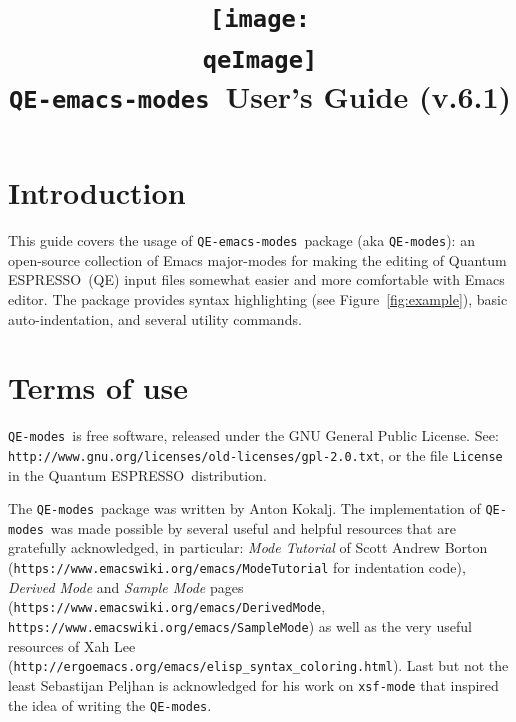 \documentclass[12pt,a4paper]{article}
\def\version{6.1}
\def\qe{{\sc Quantum ESPRESSO}}
\def\QEmodes{\texttt{QE-modes}}
\def\QEemodes{\texttt{QE-emacs-modes}}
\begin{document}
 
\author{}
\date{}

\def\qeImage{../../../Doc/quantum_espresso.pdf}

\title{
  \texttt{[image: \\qeImage]} \\
  \Huge \QEemodes\ User's Guide (v.\version) 
}

\maketitle

\tableofcontents

\section{Introduction}

This guide covers the usage of \QEemodes\ package (aka \QEmodes): an
open-source collection of Emacs major-modes for making the editing of
\qe\ (QE) input files somewhat easier and more comfortable with Emacs
editor. The package provides syntax highlighting (see
Figure~\ref{fig:example}), basic auto-indentation, and several utility
commands.

\section{Terms of use}

\QEmodes\ is free software, released under the
GNU General Public License. See:
\texttt{http://www.gnu.org/licenses/old-licenses/gpl-2.0.txt}, or the
file \texttt{License} in the \qe\ distribution.

The \QEmodes\ package was written by Anton Kokalj. The implementation
of \QEmodes\ was made possible by several useful and helpful resources
that are gratefully acknowledged, in particular: {\it Mode Tutorial}
of Scott Andrew Borton
(\texttt{https://www.emacswiki.org/emacs/ModeTutorial} for
indentation code), {\it Derived Mode} and {\it Sample Mode} pages
(\texttt{https://www.emacswiki.org/emacs/DerivedMode},
\texttt{https://www.emacswiki.org/emacs/SampleMode}) as well as the
very useful resources of Xah Lee
(\texttt{http://ergoemacs.org/emacs/elisp\_syntax\_coloring.html}). Last
but not the least Sebastijan Peljhan is acknowledged for his work on
\texttt{xsf-mode} that inspired the idea of writing the \QEmodes.

\end{document}
